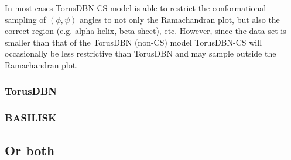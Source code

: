 In most cases TorusDBN-CS model is able to restrict the conformational sampling of $(\phi, \psi)$ angles to not only the Ramachandran plot, but also the correct region (e.g. alpha-helix, beta-sheet), etc.
However, since the data set is smaller than that of the TorusDBN (non-CS) model TorusDBN-CS will occasionally be less restrictive than TorusDBN and may sample outside the Ramachandran plot.



\subsubsection{TorusDBN}


\subsubsection{BASILISK}


\subsection{Or both}


